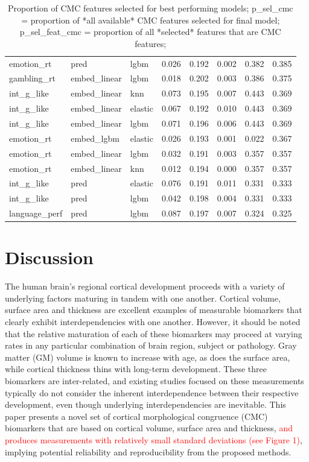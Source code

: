 \documentclass{article}
\begin{document}
\begin{table}
\begin{tabular}{lllrrrrr}
	emotion\_rt & pred & lgbm & 0.026 & 0.192 & 0.002 & 0.382 & 0.385 \\
	gambling\_rt & embed\_linear & lgbm & 0.018 & 0.202 & 0.003 & 0.386 & 0.375 \\
	int\_g\_like & embed\_linear & knn & 0.073 & 0.195 & 0.007 & 0.443 & 0.369 \\
	int\_g\_like & embed\_linear & elastic & 0.067 & 0.192 & 0.010 & 0.443 & 0.369 \\
	int\_g\_like & embed\_linear & lgbm & 0.071 & 0.196 & 0.006 & 0.443 & 0.369 \\
	emotion\_rt & embed\_lgbm & elastic & 0.026 & 0.193 & 0.001 & 0.022 & 0.367 \\
	emotion\_rt & embed\_linear & lgbm & 0.032 & 0.191 & 0.003 & 0.357 & 0.357 \\
	emotion\_rt & embed\_linear & knn & 0.012 & 0.194 & 0.000 & 0.357 & 0.357 \\
	int\_g\_like & pred & elastic & 0.076 & 0.191 & 0.011 & 0.331 & 0.333 \\
	int\_g\_like & pred & lgbm & 0.042 & 0.198 & 0.004 & 0.331 & 0.333 \\
	language\_perf & pred & lgbm & 0.087 & 0.197 & 0.007 & 0.324 & 0.325 \\
	\bottomrule
\end{tabular}
\footnotesize
\caption{Proportion of CMC features selected for best performing models;
p\_sel\_cmc = proportion of *all available* CMC features selected for final model;
p\_sel\_feat\_cmc = proportion of all *selected* features that are CMC features;
}
\normalsize
\label{tab:cmc-feature-select}
\end{table}


\section{Discussion} \label{sec:discussion}

The human brain's regional cortical development proceeds with a variety of
underlying factors maturing in tandem with one another. Cortical volume,
surface area and thickness are excellent examples of measurable biomarkers
that clearly exhibit interdependencies with one another. However, it should
be noted that the relative maturation of each of these biomarkers may proceed
at varying rates in any particular combination of brain region, subject or
pathology. Gray matter (GM) volume is known to increase with age, as does the
surface area, while cortical thickness thins with long-term development.
These three biomarkers are inter-related, and existing studies focused on
these measurements typically do not consider the inherent interdependence
between their respective development, even though underlying
interdependencies are inevitable. This paper presents a novel set of cortical
morphological congruence (CMC) biomarkers that are based on cortical volume,
surface area and thickness, \textcolor{red}{and produces measurements with
relatively small standard deviations (see Figure 1)}, implying potential
reliability and reproducibility from the proposed methods.
\end{document}

